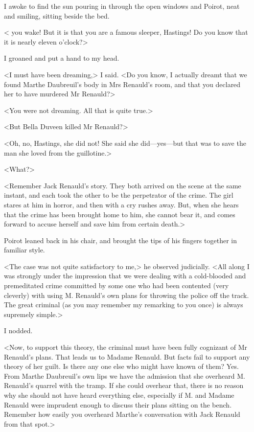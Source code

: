  I awoke to find the sun pouring in through the open windows and Poirot, neat and smiling, sitting beside the bed. 

 < you wake! But it is that you are a famous sleeper, Hastings! Do you know that it is nearly eleven o'clock?> 

 I groaned and put a hand to my head. 

 <I must have been dreaming,> I said. <Do you know, I actually dreamt that we found Marthe Daubreuil's body in Mrs Renauld's room, and that you declared her to have murdered Mr Renauld?> 

 <You were not dreaming. All that is quite true.> 

 <But Bella Duveen killed Mr Renauld?> 

 <Oh, no, Hastings, she did not! She said she did—yes—but that was to save the man she loved from the guillotine.> 

 <What?> 

 <Remember Jack Renauld's story. They both arrived on the scene at the same instant, and each took the other to be the perpetrator of the crime. The girl stares at him in horror, and then with a cry rushes away. But, when she hears that the crime has been brought home to him, she cannot bear it, and comes forward to accuse herself and save him from certain death.> 

 Poirot leaned back in his chair, and brought the tips of his fingers together in familiar style. 

 <The case was not quite satisfactory to me,> he observed judicially. <All along I was strongly under the impression that we were dealing with a cold-blooded and premeditated crime committed by some one who had been contented (very cleverly) with using M. Renauld's own plans for throwing the police off the track. The great criminal (as you may remember my remarking to you once) is always supremely simple.> 

 I nodded. 

 <Now, to support this theory, the criminal must have been fully cognizant of Mr Renauld's plans. That leads us to Madame Renauld. But facts fail to support any theory of her guilt. Is there any one else who might have known of them? Yes. From Marthe Daubreuil's own lips we have the admission that she overheard M. Renauld's quarrel with the tramp. If she could overhear that, there is no reason why she should not have heard everything else, especially if M. and Madame Renauld were imprudent enough to discuss their plans sitting on the bench. Remember how easily you overheard Marthe's conversation with Jack Renauld from that spot.> 

